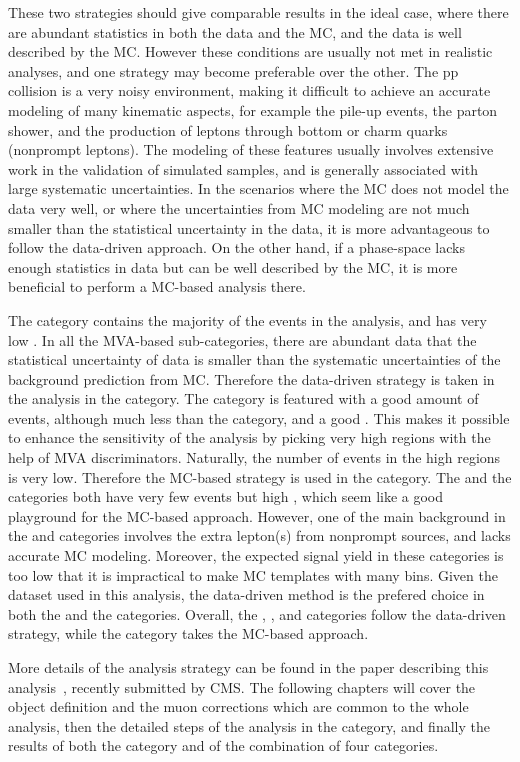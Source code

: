 These two strategies should give comparable results in the ideal case, where there are abundant statistics in both the data and the MC,
and the data is well described by the MC.
However these conditions are usually not met in realistic analyses, and one strategy may become preferable over the other.
The pp collision is a very noisy environment, making it difficult to achieve an accurate modeling of many kinematic aspects,
for example the pile-up events, the parton shower, and the production of leptons through bottom or charm quarks (nonprompt leptons).
The modeling of these features usually involves extensive work in the validation of simulated samples, and is generally associated with large systematic uncertainties.
In the scenarios where the MC does not model the data very well, or where the uncertainties from MC modeling are not much smaller than the statistical uncertainty in the data,
it is more advantageous to follow the data-driven approach.
On the other hand, if a phase-space lacks enough statistics in data but can be well described by the MC, 
it is more beneficial to perform a MC-based analysis there.

The \ggH category contains the majority of the events in the \hmm analysis, and has very low \SoB. 
In all the MVA-based sub-categories, there are abundant data that the statistical uncertainty of data is smaller than the systematic uncertainties of the background prediction from MC.
Therefore the data-driven strategy is taken in the analysis in the \ggH category.
The \qqH category is featured with a good amount of events, although much less than the \ggH category, and a good \SoB.
This makes it possible to enhance the sensitivity of the analysis by picking very high \SoB regions with the help of MVA discriminators. 
Naturally, the number of events in the high \SoB regions is very low. Therefore the MC-based strategy is used in the \qqH category.
The \VH and the \ttH categories both have very few events but high \SoB, which seem like a good playground for the MC-based approach.
However, one of the main background in the \VH and \ttH categories involves the extra lepton(s) from nonprompt sources, and lacks accurate MC modeling.
Moreover, the expected signal yield in these categories is too low that it is impractical to make MC templates with many bins.
Given the dataset used in this analysis, the data-driven method is the prefered choice in both the \VH and the \ttH categories.
Overall, the \ggH, \VH, and \ttH categories follow the data-driven strategy, while the \qqH category takes the MC-based approach.

More details of the analysis strategy can be found in the paper describing this analysis~\cite{cmscollaboration2020evidence}, recently submitted by CMS. 
The following chapters will cover the object definition and the muon corrections which are common to the whole analysis, 
then the detailed steps of the analysis in the \VH category, 
and finally the results of both the \VH category and of the combination of four categories.
